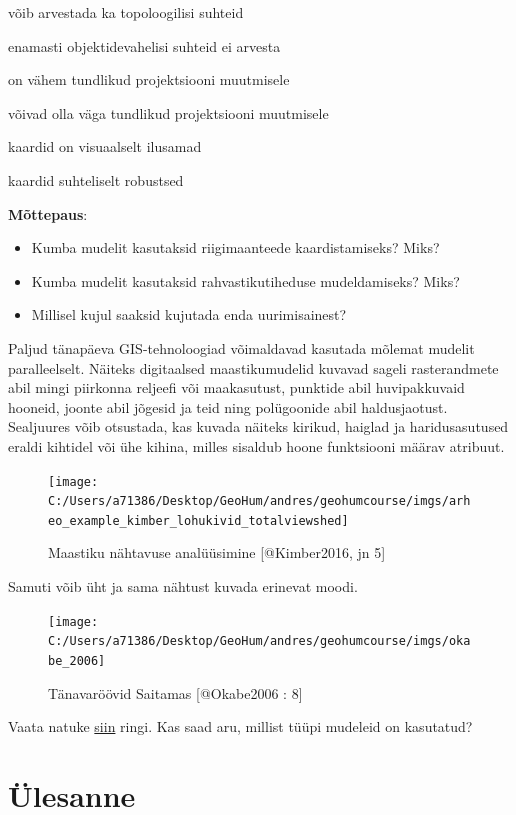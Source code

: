 \documentclass[
]{book}
\providecommand{\tightlist}{%
  \setlength{\itemsep}{0pt}\setlength{\parskip}{0pt}}
\begin{document}
võib arvestada ka topoloogilisi suhteid

enamasti objektidevahelisi suhteid ei arvesta

on vähem tundlikud projektsiooni muutmisele

võivad olla väga tundlikud projektsiooni muutmisele

kaardid on visuaalselt ilusamad

kaardid suhteliselt robustsed

\textbf{Mõttepaus}:

\begin{itemize}
\tightlist
\item
  Kumba mudelit kasutaksid riigimaanteede kaardistamiseks? Miks?\\
\item
  Kumba mudelit kasutaksid rahvastikutiheduse mudeldamiseks? Miks?\\
\item
  Millisel kujul saaksid kujutada enda uurimisainest?
\end{itemize}

Paljud tänapäeva GIS-tehnoloogiad võimaldavad kasutada mõlemat mudelit paralleelselt. Näiteks digitaalsed maastikumudelid kuvavad sageli rasterandmete abil mingi piirkonna reljeefi või maakasutust, punktide abil huvipakkuvaid hooneid, joonte abil jõgesid ja teid ning polügoonide abil haldusjaotust. Sealjuures võib otsustada, kas kuvada näiteks kirikud, haiglad ja haridusasutused eraldi kihtidel või ühe kihina, milles sisaldub hoone funktsiooni määrav atribuut.

\begin{figure}
\texttt{[image: C:/Users/a71386/Desktop/GeoHum/andres/geohumcourse/imgs/arheo\_example\_kimber\_lohukivid\_totalviewshed]} \caption{Maastiku nähtavuse analüüsimine [@Kimber2016, jn 5]}\label{fig:arheo-ex}
\end{figure}

Samuti võib üht ja sama nähtust kuvada erinevat moodi.

\begin{figure}
\texttt{[image: C:/Users/a71386/Desktop/GeoHum/andres/geohumcourse/imgs/okabe\_2006]} \caption{Tänavaröövid Saitamas [@Okabe2006 : 8]}\label{fig:unnamed-chunk-3}
\end{figure}

Vaata natuke \href{http://blog.ut.ee/30-maps-of-estonia-in-30-days/}{siin} ringi. Kas saad aru, millist tüüpi mudeleid on kasutatud?

\hypertarget{uxfclesanne}{%
\section{Ülesanne}\label{uxfclesanne}}
\end{document}
